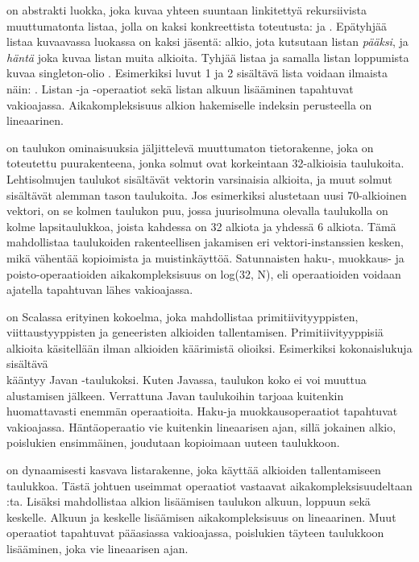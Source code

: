  on abstrakti luokka, joka kuvaa yhteen suuntaan linkitettyä rekursiivista muuttumatonta listaa, jolla on kaksi konkreettista toteutusta: \code{::} ja . Epätyhjää listaa kuvaavassa luokassa \code{::} on kaksi jäsentä: alkio, jota kutsutaan listan \textit{pääksi}, ja \textit{häntä} joka kuvaa listan muita alkioita. Tyhjää listaa ja samalla listan loppumista kuvaa singleton-olio . Esimerkiksi luvut 1 ja 2 sisältävä lista voidaan ilmaista näin: . Listan -ja -operaatiot sekä listan alkuun lisääminen tapahtuvat vakioajassa. Aikakompleksisuus alkion hakemiselle indeksin perusteella on lineaarinen.
\cite{scalaAPI}
\cite{scalaCollections}

 on taulukon ominaisuuksia jäljittelevä muuttumaton tietorakenne, joka on toteutettu puurakenteena, jonka solmut ovat korkeintaan 32-alkioisia taulukoita. Lehtisolmujen taulukot sisältävät vektorin varsinaisia alkioita, ja muut solmut sisältävät alemman tason taulukoita. Jos esimerkiksi alustetaan uusi 70-alkioinen vektori, on se kolmen taulukon puu, jossa juurisolmuna olevalla taulukolla on kolme lapsitaulukkoa, joista kahdessa on 32 alkiota ja yhdessä 6 alkiota. Tämä mahdollistaa taulukoiden rakenteellisen jakamisen eri vektori-instanssien kesken, mikä vähentää kopioimista ja muistinkäyttöä. Satunnaisten haku-, muokkaus- ja poisto-operaatioiden aikakompleksisuus on log(32, N), eli operaatioiden voidaan ajatella tapahtuvan lähes vakioajassa.
\cite{scalaCollections}
\cite[Luku 4]{highPerformanceProgramming}

 on Scalassa erityinen kokoelma, joka mahdollistaa primitiivityyppisten, viittaustyyppisten ja geneeristen alkioiden tallentamisen. Primitiivityyppisiä alkioita käsitellään ilman alkioiden käärimistä olioiksi. Esimerkiksi kokonaislukuja sisältävä \\ kääntyy Javan -taulukoksi. Kuten Javassa, taulukon koko ei voi muuttua alustamisen jälkeen. Verrattuna Javan taulukoihin  tarjoaa kuitenkin huomattavasti enemmän operaatioita. Haku-ja muokkausoperaatiot tapahtuvat vakioajassa. Häntäoperaatio vie kuitenkin lineaarisen ajan, sillä jokainen alkio, poislukien ensimmäinen, joudutaan kopioimaan uuteen taulukkoon.
\cite{scalaCollections}

 on dynaamisesti kasvava listarakenne, joka käyttää alkioiden tallentamiseen taulukkoa. Tästä johtuen useimmat operaatiot vastaavat aikakompleksisuudeltaan :ta. Lisäksi  mahdollistaa alkion lisäämisen taulukon alkuun, loppuun sekä keskelle. Alkuun ja keskelle lisäämisen aikakompleksisuus on lineaarinen. Muut operaatiot tapahtuvat pääasiassa vakioajassa, poislukien täyteen taulukkoon lisääminen, joka vie lineaarisen ajan.
\cite{scalaCollections}

